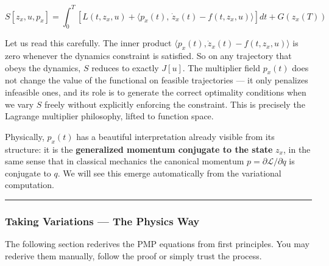 \documentclass{article}
\begin{document}
\begin{equation}
S[z_x, u, p_x] = \int_0^T \left[ L(t, z_x, u) + \langle p_x(t),\, \dot{z}_x(t) - f(t, z_x, u) \rangle \right] dt + G(z_x(T))
\label{eq:augmented-action}
\end{equation}

Let us read this carefully. The inner product $\langle p_x(t), \dot{z}_x(t) - f(t, z_x, u)\rangle$ is zero whenever the dynamics constraint is satisfied. So on any trajectory that obeys the dynamics, $S$ reduces to exactly $J[u]$. The multiplier field $p_x(t)$ does not change the value of the functional on feasible trajectories — it only penalizes infeasible ones, and its role is to generate the correct optimality conditions when we vary $S$ freely without explicitly enforcing the constraint. This is precisely the Lagrange multiplier philosophy, lifted to function space.

\begin{physicsinsightbox}
Physically, $p_x(t)$ has a beautiful interpretation already visible from its structure: it is the \textbf{generalized momentum conjugate to the state} $z_x$, in the same sense that in classical mechanics the canonical momentum $p = \partial \mathcal{L}/\partial \dot{q}$ is conjugate to $q$. We will see this emerge automatically from the variational computation.
\end{physicsinsightbox}

\medskip\hrule\medskip

\subsubsection{Taking Variations --- The Physics Way}

The following section rederives the PMP equations from first principles. You may rederive them manually, follow the proof or simply trust the process.
\end{document}
